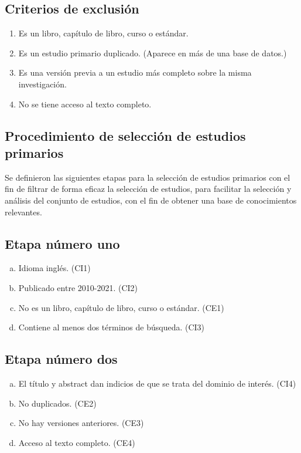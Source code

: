\documentclass{article}
\begin{document}
\subsection{Criterios de exclusión}
\begin{enumerate}[CE-1.-]
  \item{Es un libro, capítulo de libro, curso o estándar.}
  \item{Es un estudio primario duplicado. (Aparece en más de una base de datos.)}
  \item{Es una versión previa a un estudio más completo sobre la misma investigación.}
  \item{No se tiene acceso al texto completo.}
\end{enumerate}
\newpage

\subsection{Procedimiento de selección de estudios primarios}
Se definieron las siguientes etapas para la selección de estudios primarios con el fin 
de filtrar de forma eficaz la selección de estudios, para facilitar la selección y análisis 
del conjunto de estudios, con el fin de obtener una base de conocimientos relevantes. 

\subsection{Etapa número uno}
\begin{enumerate}[(a)]
  \item{Idioma inglés. (CI1)}
  \item{Publicado entre 2010-2021. (CI2)}
  \item{No es un libro, capítulo de libro, curso o estándar. (CE1)}
  \item{Contiene al menos dos términos de búsqueda. (CI3)}
\end{enumerate}

\subsection{Etapa número dos}
\begin{enumerate}[(a)]
  \item{El título y abstract dan indicios de que se trata del dominio de interés. (CI4)}
  \item{No duplicados. (CE2)}
  \item{No hay versiones anteriores. (CE3) }
  \item{Acceso al texto completo. (CE4)}
\end{enumerate}
\end{document}
